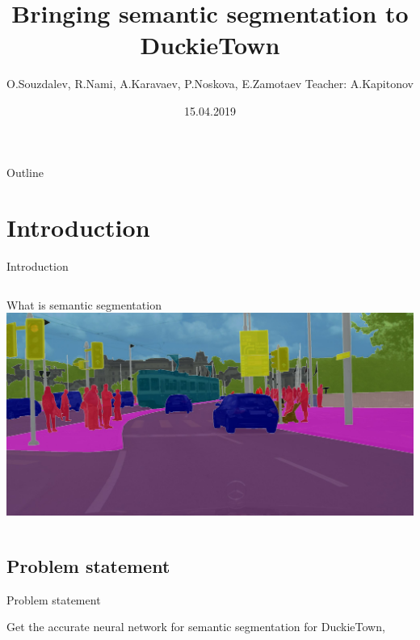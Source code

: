 \documentclass{beamer}
\title[Bringing semantic segmentation to DuckieTown]{Bringing semantic segmentation to DuckieTown}
\author[ITMO University]{O.Souzdalev, R.Nami, A.Karavaev, P.Noskova, E.Zamotaev Teacher: A.Kapitonov}
\date{15.04.2019}
\begin{document}
\begin{frame}
  \titlepage
\end{frame}

\begin{frame}{Outline}
  \tableofcontents
\end{frame}

\section{Introduction}

\begin{frame}{Introduction}

\begin{columns}
What is semantic segmentation
    \includegraphics[width=\textwidth]{fig/semantic.jpeg}



\end{columns}



\end{frame}

\subsection{Problem statement}
\begin{frame}{Problem statement}

Get the accurate neural network for semantic segmentation for DuckieTown,

\end{frame}
\end{document}
